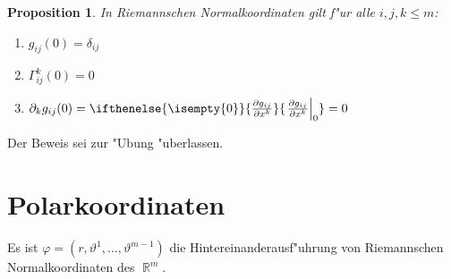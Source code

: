 \documentclass[paper=A4, twoside, chapterprefix=true, bibliography=totoc, headsepline]{scrbook}
\let\temp\phi{}
\let\phi\varphi{}
\let\varphi\temp{}
\let\temp\theta{}
\let\theta\vartheta{}
\let\vartheta\temp{}
\let\temp\epsilon{}
\let\epsilon\varepsilon{}
\let\varepsilon\temp{}
\let\temp\rho{}
\let\rho\varrho{}
\let\varrho\temp{}
\DeclareMathOperator{\R}{\mathbb{R}}
\newcommand{\pdifffrac}[3][]{\ifthenelse{\isempty{#1}}{\frac{\partial #2}{\partial #3}}{\left. \frac{\partial #2}{\partial #3} \right|_{#1}}}
\theoremstyle{plain}
\newtheorem{Prop}[Dfn]{Proposition}
\theoremstyle{nonumberplain}
\theoremstyle{empty}
\theoremstyle{break}
\begin{document}
\begin{Prop}
  In Riemannschen Normalkoordinaten gilt f"ur alle $i,j,k \leq m$:
  \begin{enumerate}[label=(\roman*)]
  \item
    $g_{ij}(0) = \delta_{ij}$
  \item
    $\Gamma^k_{ij}(0) = 0$
  \item
    $\partial_k g_{ij}(0) = \pdifffrac[0]{g_{ij}}{x^k} = 0$
  \end{enumerate}\end{Prop}

Der Beweis sei zur "Ubung "uberlassen.

\section{Polarkoordinaten}

Es ist $\phi = (r, \theta^1, \ldots, \theta^{m-1})$ die Hintereinanderausf"uhrung von Riemannschen Normalkoordinaten des $\R^m$.
\end{document}
